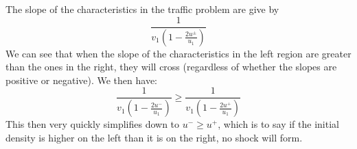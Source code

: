 \documentclass{article}
\begin{document}
The slope of the characteristics in the traffic problem are give by 
\begin{equation}
\frac{1}{v_1(1-\frac{2u^{\pm}}{u_1})}
\end{equation}
We can see that when the slope of the characteristics in the left region are greater than the ones in the right, they will cross (regardless of whether the slopes are positive or negative). We then have:
\begin{equation}
\frac{1}{v_1(1-\frac{2u^-}{u_1})} \geq \frac{1}{v_1(1-\frac{2u^+}{u_1})}
\end{equation}
This then very quickly simplifies down to $u^- \geq u^+$, which is to say if the initial density is higher on the left than it is on the right, no shock will form.
\end{document}
